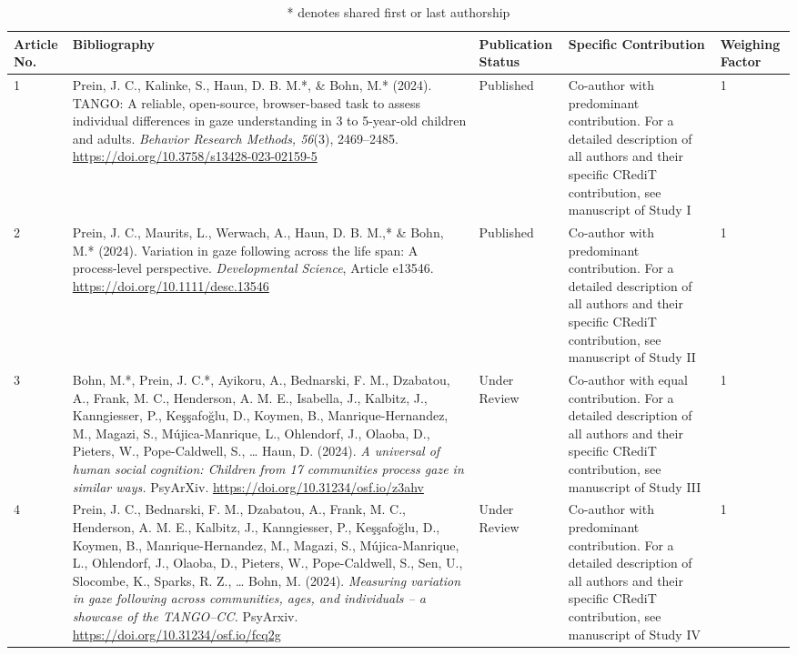 \documentclass[
]{scrbook}
\begin{document}
\begin{table}[H]
\centering
\footnotesize
\begin{tabular}{p{8mm}p{57mm}p{18mm}p{38mm}p{13mm}}\toprule
Article No. & Bibliography & Publication Status & Specific Contribution & Weighing Factor \\
\midrule
1 & Prein, J. C., Kalinke, S., Haun, D. B. M.*, \& Bohn, M.* (2024). TANGO: A reliable, open-source, browser-based task to assess individual differences in gaze understanding in 3 to 5-year-old children and adults. \textit{Behavior Research Methods, 56}(3), 2469–2485. \url{https://doi.org/10.3758/s13428-023-02159-5} & Published & Co-author with predominant contribution. For a detailed description of all authors and their specific CRediT contribution, see manuscript of Study I & 1 \\
2 & Prein, J. C., Maurits, L., Werwach, A., Haun, D. B. M.,* \& Bohn, M.* (2024). Variation in gaze following across the life span: A process-level perspective. \textit{Developmental Science}, Article e13546. \url{https://doi.org/10.1111/desc.13546} & Published & Co-author with predominant contribution. For a detailed description of all authors and their specific CRediT contribution, see manuscript of Study II & 1 \\
3 & Bohn, M.*, Prein, J. C.*, Ayikoru, A., Bednarski, F. M., Dzabatou, A., Frank, M. C., Henderson, A. M. E., Isabella, J., Kalbitz, J., Kanngiesser, P., Keşşafoğlu, D., Koymen, B., Manrique-Hernandez, M., Magazi, S., Mújica-Manrique, L., Ohlendorf, J., Olaoba, D., Pieters, W., Pope-Caldwell, S., … Haun, D. (2024). \textit{A universal of human social cognition: Children from 17 communities process gaze in similar ways.} PsyArXiv. \url{https://doi.org/10.31234/osf.io/z3ahv} & Under Review & Co-author with equal contribution. For a detailed description of all authors and their specific CRediT contribution, see manuscript of Study III & 1 \\
4 & Prein, J. C., Bednarski, F. M., Dzabatou, A., Frank, M. C., Henderson, A. M. E., Kalbitz, J., Kanngiesser, P., Keşşafoğlu, D., Koymen, B., Manrique-Hernandez, M., Magazi, S., Mújica-Manrique, L., Ohlendorf, J., Olaoba, D., Pieters, W., Pope-Caldwell, S., Sen, U., Slocombe, K., Sparks, R. Z., … Bohn, M. (2024). \textit{Measuring variation in gaze following across communities, ages, and individuals – a showcase of the TANGO–CC.} PsyArxiv. \url{https://doi.org/10.31234/osf.io/fcq2g} & Under Review & Co-author with predominant contribution. For a detailed description of all authors and their specific CRediT contribution, see manuscript of Study IV & 1 \\
\bottomrule
\end{tabular}
\caption{\scriptsize{* denotes shared first or last authorship}}
\end{table}
\end{document}
